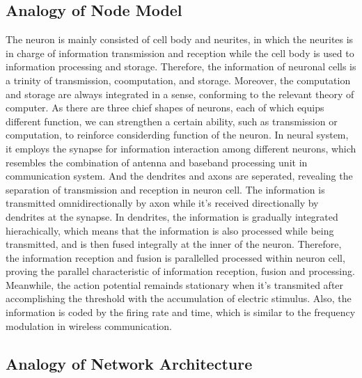 \documentclass[journal,comsoc]{IEEEtran}
\begin{document}
		\subsection{Analogy of Node Model}
		\label{subsec: analogy_of_node_model}
			The neuron is mainly consisted of cell body and neurites, in which the neurites is in charge of information transmission and reception while the cell body is used to information processing and storage.
			Therefore, the information of neuronal cells is a trinity of transmission, coomputation, and storage.
			Moreover, the computation and storage are always integrated in a sense, conforming to the relevant theory of computer.
			As there are three chief shapes of neurons, each of which equips different function, we can strengthen a certain ability, such as transmission or computation, to reinforce considerding function of the neuron.
			In neural system, it employs the synapse for information interaction among different neurons, which resembles the combination of antenna and baseband processing unit in communication system.
			And the dendrites and axons are seperated, revealing the separation of transmission and reception in neuron cell. 
			The information is transmitted omnidirectionally by axon while it's received directionally by dendrites at the synapse.
			In dendrites, the information is gradually integrated hierachically, which means that the information is also processed while being transmitted,  and is then fused integrally at the inner of the neuron.
			Therefore, the information reception and fusion is parallelled processed within neuron cell, proving the parallel characteristic of information reception, fusion and processing.
			Meanwhile, the action potential remainds stationary when it's transmited after accomplishing the threshold with the accumulation of electric stimulus.
			Also, the information is coded by the firing rate and time, which is similar to the frequency modulation in wireless communication.

		\subsection{Analogy of Network Architecture}
		
\end{document}
